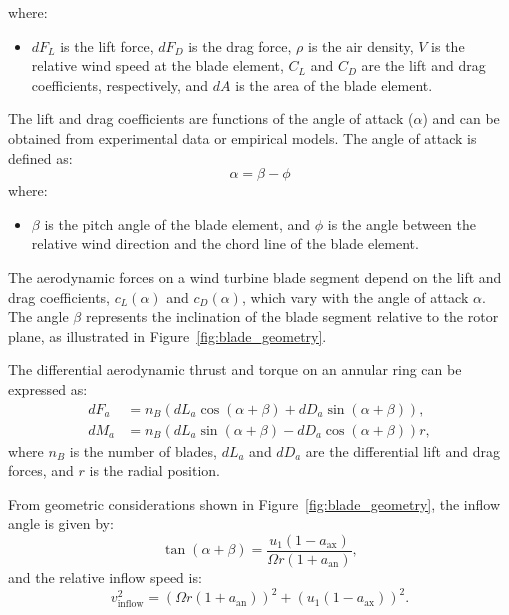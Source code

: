 where:
\begin{itemize}
    \item $dF_L$ is the lift force, $dF_D$ is the drag force, $\rho$ is the air density, $V$ is the relative wind speed at the blade element, $C_L$ and $C_D$ are the lift and drag coefficients, respectively, and $dA$ is the area of the blade element.
\end{itemize}
The lift and drag coefficients are functions of the angle of attack ($\alpha$) and can be obtained from experimental data or empirical models. The angle of attack is defined as:
\begin{equation}
\alpha = \beta - \phi
\end{equation}
where:
\begin{itemize}
    \item $\beta$ is the pitch angle of the blade element, and $\phi$ is the angle between the relative wind direction and the chord line of the blade element.
\end{itemize}
The aerodynamic forces on a wind turbine blade segment depend on the lift and drag coefficients, $c_L(\alpha)$ and $c_D(\alpha)$, which vary with the angle of attack $\alpha$. The angle $\beta$ represents the inclination of the blade segment relative to the rotor plane, as illustrated in Figure~\ref{fig:blade_geometry}.

The differential aerodynamic thrust and torque on an annular ring can be expressed as:
\begin{align}
    dF_a &= n_B \left( dL_a \cos(\alpha + \beta) + dD_a \sin(\alpha + \beta) \right), \label{eq:thrust_force} \\
    dM_a &= n_B \left( dL_a \sin(\alpha + \beta) - dD_a \cos(\alpha + \beta) \right) r, \label{eq:torque}
\end{align}
where $n_B$ is the number of blades, $dL_a$ and $dD_a$ are the differential lift and drag forces, and $r$ is the radial position.

From geometric considerations shown in Figure~\ref{fig:blade_geometry}, the inflow angle is given by:
\begin{equation}
    \tan(\alpha + \beta) = \frac{u_1(1 - a_{\text{ax}})}{\Omega r (1 + a_{\text{an}})},
\end{equation}
and the relative inflow speed is:
\begin{equation}
    v_{\text{inflow}}^2 = \left( \Omega r (1 + a_{\text{an}}) \right)^2 + \left( u_1 (1 - a_{\text{ax}}) \right)^2. \label{eq:inflow_speed}
\end{equation}

